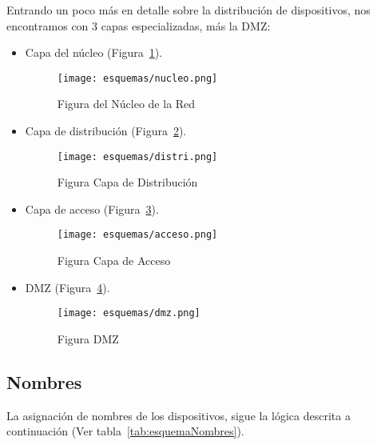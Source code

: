 \documentclass[a4paper,onecolumn,11pt]{article}
\begin{document}
Entrando un poco más en detalle sobre la distribución de dispositivos, nos encontramos con 3 capas especializadas, más la DMZ:
\begin{itemize}
\item Capa del núcleo (Figura~\ref{fig:nucleo}).
\begin{figure}[thbp]
\centering
\texttt{[image: esquemas/nucleo.png]}
\caption{Figura del Núcleo de la Red}
\label{fig:nucleo}
\end{figure}
\item Capa de distribución (Figura~\ref{fig:distri}).
\begin{figure}[thbp]
\centering
\texttt{[image: esquemas/distri.png]}
\caption{Figura Capa de Distribución}
\label{fig:distri}
\end{figure}
\item Capa de acceso (Figura~\ref{fig:acceso}).
\begin{figure}[thbp]
\centering
\texttt{[image: esquemas/acceso.png]}
\caption{Figura Capa de Acceso}
\label{fig:acceso}
\end{figure}
\item DMZ (Figura~\ref{fig:dmz}).
\begin{figure}[thbp]
\centering
\texttt{[image: esquemas/dmz.png]}
\caption{Figura DMZ}
\label{fig:dmz}
\end{figure}
\end{itemize}
\subsection{Nombres}

La asignación de nombres de los dispositivos, sigue la lógica descrita a continuación (Ver tabla~\ref{tab:esquemaNombres}).
\end{document}
